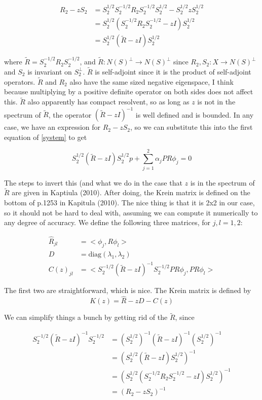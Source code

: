 \documentclass[12pt]{article}
\begin{document}
\begin{align}
R_2 - z S_2 &= S_2^{1/2} S_2^{-1/2} R_2 S_2^{-1/2} S_2^{1/2} - S_2^{1/2} z S_2^{1/2} \\
&= S_2^{1/2} ( S_2^{-1/2} R_2 S_2^{-1/2} - z I ) S_2^{1/2} \\
&= S_2^{1/2} ( \tilde{R} - z I ) S_2^{1/2} 
\end{align}

where $\tilde{R} = S_2^{-1/2} R_2 S_2^{-1/2}$, and $\tilde{R}: N(S)^\perp \rightarrow N(S)^\perp$ since $R_2, S_2: X \rightarrow N(S)^\perp$ and $S_2$ is invariant on $S_2^\perp$. $\tilde{R}$ is self-adjoint since it is the product of self-adjoint operators. $\tilde{R}$ and $R_2$ also have the same sized negative eigenspace, I think because multiplying by a positive definite operator on both sides does not affect this. $\tilde{R}$ also apparently has compact resolvent, so as long as $z$ is not in the spectrum of $\tilde{R}$, the operator $( \tilde{R} - z I )^{-1}$ is well defined and is bounded. In any case, we have an expression for $R_2 - zS_2$, so we can substitute this into the first equation of \eqref{system} to get

\[
S_2^{1/2} ( \tilde{R} - z I ) S_2^{1/2} p + \sum_{j=1}^2 \alpha_j P R \phi_j = 0 
\]

The steps to invert this (and what we do in the case that $z$ is in the spectrum of $\tilde{R}$ are given in Kaptiula (2010). After doing, the Krein matrix is defined on the bottom of p.1253 in Kapitula (2010). The nice thing is that it is 2x2 in our case, so it should not be hard to deal with, assuming we can compute it numerically to any degree of accuracy. We define the following three matrices, for $j, l = 1, 2$:

\begin{align}
\hat{R}_{jl} &= <\phi_j, R \phi_l> \\
D &= \textrm{diag}(\lambda_1, \lambda_2) \\
C(z)_{jl} &= <S_2^{-1/2}(\tilde{R} - zI)^{-1} S_2^{-1/2} P R \phi_j, P R \phi_l>
\end{align}

The first two are straightforward, which is nice. The Krein matrix is defined by 
\begin{equation}\label{kreinmatrix}
K(z) = \hat{R} - zD - C(z)
\end{equation}

We can simplify things a bunch by getting rid of the $\tilde{R}$, since

\begin{align}
S_2^{-1/2}(\tilde{R} - zI)^{-1} S_2^{-1/2} &= (S_2^{1/2})^{-1}(\tilde{R} - zI)^{-1} (S_2^{1/2})^{-1} \\
&= ( S_2^{1/2} ( \tilde{R} - zI ) S_2^{1/2} )^{-1} \\
&= ( S_2^{1/2} ( S_2^{-1/2} R_2 S_2^{-1/2} - zI ) S_2^{1/2} )^{-1} \\
&= ( R_2 - z S_2 )^{-1}
\end{align}
\end{document}
